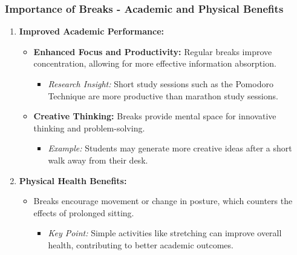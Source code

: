 \documentclass[aspectratio=169]{beamer}
\begin{document}
\begin{frame}[fragile]
    \frametitle{Importance of Breaks - Academic and Physical Benefits}
    \begin{enumerate}
        \item \textbf{Improved Academic Performance:}
        \begin{itemize}
            \item \textbf{Enhanced Focus and Productivity:} Regular breaks improve concentration, allowing for more effective information absorption.
            \begin{itemize}
                \item \textit{Research Insight:} Short study sessions such as the Pomodoro Technique are more productive than marathon study sessions.
            \end{itemize}
            \item \textbf{Creative Thinking:} Breaks provide mental space for innovative thinking and problem-solving.
            \begin{itemize}
                \item \textit{Example:} Students may generate more creative ideas after a short walk away from their desk.
            \end{itemize}
        \end{itemize}

        \item \textbf{Physical Health Benefits:}
        \begin{itemize}
            \item Breaks encourage movement or change in posture, which counters the effects of prolonged sitting.
            \begin{itemize}
                \item \textit{Key Point:} Simple activities like stretching can improve overall health, contributing to better academic outcomes.
            \end{itemize}
        \end{itemize}
    \end{enumerate}
\end{frame}
\end{document}
